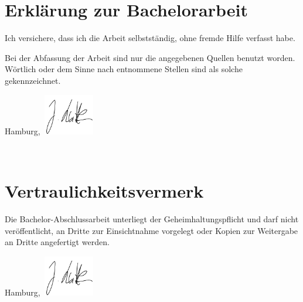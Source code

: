 \thispagestyle{empty}
\section*{Erklärung zur Bachelorarbeit}%

Ich versichere, dass ich die Arbeit selbstständig, ohne fremde Hilfe verfasst habe.
\par
Bei der Abfassung der Arbeit sind nur die angegebenen Quellen benutzt worden.\\
Wörtlich oder dem Sinne nach entnommene Stellen sind als solche gekennzeichnet.

\vspace{1.5cm}

Hamburg,~\mydate \hfill	\includegraphics[width=22mm]{Bilder/Unterschrift.png}

\vspace{1.5cm}
\hrulefill\\
\vspace{1cm}
\section*{Vertraulichkeitsvermerk}%

Die Bachelor-Abschlussarbeit unterliegt der Geheimhaltungspflicht und darf nicht veröffentlicht, an Dritte zur Einsichtnahme vorgelegt oder Kopien zur Weitergabe an Dritte angefertigt werden.

\vspace{1.5cm}

Hamburg,~\mydate \hfill \includegraphics[width=22mm]{Bilder/Unterschrift.png}




%
%
%

